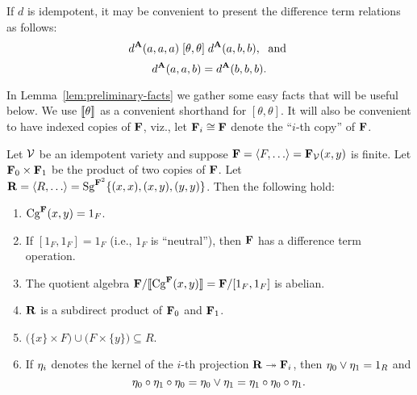 If $d$ is idempotent, it may be convenient to present the difference term
relations as follows:
\begin{equation}
  \label{dt-rel-idemp}
  d^{\mathbf{A}}(a,a,a) \mathrel{[\theta, \theta]} d^{\mathbf{A}}(a,b,b), \; \text{ and }
\end{equation}
\begin{equation}
  \label{dt-id-idemp}
d^{\mathbf{A}}(a,a,b) =   d^{\mathbf{A}}(b,b,b).
\end{equation}

In Lemma~\ref{lem:preliminary-facts} we gather
some easy facts that will be useful below.
We use $\llbracket \theta \rrbracket$ as a convenient shorthand for 
$[\theta,\theta]$. %
It will also be convenient to have indexed copies of $\mathbf{F}$, viz.,
let $\mathbf{F}_i \cong \mathbf{F}$ denote the ``$i$-th copy'' of $\mathbf{F}$. 
\begin{lemma}
\label{lem:preliminary-facts}
Let $\mathcal{V}$ be an idempotent variety and suppose 
$\bF = \<F, \dots\> = \bF_{\sV}(x,y)$ is finite. 
Let $\mathbf{F}_0 \times \mathbf{F}_1$ be the product of two copies of $\mathbf{F}$.
Let $\bR = \<R, \dots\> = \Sg^{\bF^2}\{(x, x), (x, y), (y, y)\}$. 
Then the following hold:
\begin{enumerate}
\item \label{item:1}
  $\operatorname{Cg}^{\mathbf{F}}(x,y) = 1_F$.

  \smallskip
\item \label{item:1.5}
  If $[1_F, 1_F] = 1_F$ (i.e., $1_F$ is ``neutral''), then
  $\mathbf{F}$ has a difference term operation.

\smallskip
\item \label{item:2}
The quotient algebra $\mathbf{F}/\llbracket \operatorname{Cg}^{\mathbf{F}}(x,y) \rrbracket = \mathbf{F}/[1_F,1_F]$ is abelian.


\smallskip
\item \label{item:3}
$\mathbf{R}$ is a subdirect product of $\mathbf{F}_0$ and $\mathbf{F}_1$.

\smallskip
\item \label{item:4}
$\bigl(\{x\} \times F\bigr) \cup \bigl(F \times \{y\}\bigr) \subseteq R$.

\smallskip
\item \label{item:5}
If $\eta_i$ denotes the kernel of the
$i$-th projection $\mathbf{R} \twoheadrightarrow \mathbf{F}_i$, then 
$\eta_0 \vee \eta_1 = 1_R$ and 
\[
\eta_0 \circ \eta_1 \circ \eta_0 = \eta_0 \vee \eta_1 = 
  \eta_1 \circ \eta_0 \circ \eta_1.
\]
\end{enumerate}
\end{lemma}

